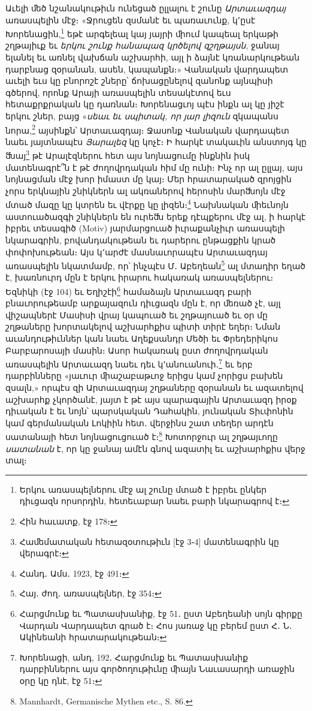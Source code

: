 \documentclass{article}
\begin{document}
{Աւելի ﬔծ նշանակութիւն ունեցած ըլլալու է շունը \emph{Արտաւազդայ} առասպելին մէջ։ «Ջրուցեն զսմանէ եւ պառաւունք, կ՚ըսէ Խորենացին,\footnote{Երկու առասպելներու մէջ ալ շունը մտած է իբրեւ ընկեր դիւցազն որսորդին, հետեւաբար նաեւ բարի նկարագրով է։} եթէ արգելեալ կայ յայրի ﬕում կապեալ երկաթի շղթայիւք եւ \emph{երկու շունք հանապազ կրծելով զշղթայսն}, ջանայ ելանել եւ առնել վախճան աշխարհի, այլ ի ձայնէ կռանարկութեան դարբնաց զօրանան, ասեն, կապանքն։» Վանական վարդապետ աւելի եւս կը բնորոշէ շները՝ ճոխացընելով զանոնք այնպիսի գծերով, որոնք Արայի առասպելին տեսակէտով եւս հետաքրքրական կը դառնան։ Խորենացւոյ պէս ինքն ալ կը յիշէ երկու շներ, բայց «\emph{սեաւ եւ սպիտակ, որ յար լիզուն} զկապանս նորա,\footnote{Հին հաւատք, էջ 178։} այսինքն՝ Արտաւազդայ։ Ջասոնք Վանական վարդապետ նաեւ յայտնապէս \emph{Յարալեզ} կը կոչէ։ Ի հարկէ տակաւին անստոյգ կը ﬓայ\footnote{Հաﬔմատական հետազօտութիւն [էջ 3֊4] մատենագրին կը վերագրէ։} թէ Արալէզներու հետ այս նոյնացումը ինքնին իսկ մատենագրէ՞ն է թէ ժողովրդական հիմ մը ունի։ Ինչ որ ալ ըլլայ, այս նոյնացման մէջ խոր իմաստ մը կայ։ Մեր հրատարակած զրոյցին չորս երկնային շնիկներն ալ ակռաներով հերոսին մարﬓոյն մէջ մտած մազը կը կտրեն եւ վէրքը կը լիզեն։\footnote{Հանդ․ Ամս․ 1923, էջ 491։} Նախնական ﬕեւնոյն աստուածազգի շնիկներն են ուրեﬓ երեք դէպքերու մէջ ալ, ի հարկէ իբրեւ տեսագիծ (Motiv) յարմարցուած իւրաքանչիւր առասպելի նկարագրին, բովանդակութեան եւ դարերու ընթացքին կրած փոփոխութեան։ Այս կ՚արժէ մասնաւորապէս Արտաւազդայ առասպելին նկատմամբ, որ՝ ինչպէս Մ․ Աբեղեան\footnote{Հայ․ ժող․ առասպելներ, էջ 354։} ալ մտադիր եղած է, խառնուրդ մըն է երկու իրարու հակառակ առասպելներու։ Եզնիկի (էջ 104) եւ Եղիշէի\footnote{Հարցմունք եւ Պատասխանիք, էջ 51․ ըստ Աբեղեանի սոյն գիրքը Վարդան Վարդապետ գրած է։ Հոս յառաջ կը բերեմ ըստ Հ․ Ն․ Ակինեանի հրատարակութեան։} համաձայն Արտաւազդ բարի բնաւորութեամբ արքայազուն դիւցազն մըն է, որ ﬔռած չէ, այլ վիշապներէ Մասիսի վրայ կապուած եւ շղթայուած եւ օր մը շղթաները խորտակելով աշխարհքիս պիտի տիրէ եղեր։ Նման աւանդութիւններ կան նաեւ Աղեքսանդր Մեծի եւ Փրեդերիկոս Բարբարոսայի մասին։ Ասոր հակառակ ըստ ժողովրդական առասպելին Արտաւազդ նաեւ դեւ կ՚անուանուի․\footnote{Խորենացի, անդ, 192․ Հարցմունք եւ Պատասխանիք դարբիններու այս գործողութիւնը ﬕայն Նաւասարդի առաջին օրը կը դնէ, էջ 51։} եւ երբ դարբինները «յաւուր ﬕաշաբաթւոջ երիցս կամ չորիցս բախեն զսալն,» որպէս զի Արտաւազդայ շղթաները զօրանան եւ ազատելով աշխարհք չկործանէ, յայտ է թէ այս պարագային Արտաւազդ իրօք դիւական է եւ նոյն՝ պարսկական Դահակին, յունական Տիւփոնին կամ գերմանական Լոկիին հետ․ վերջինս շատ տեղեր արդէն սատանայի հետ նոյնացուցուած է։\footnote{Mannhardt, Germanische Mythen etc., S. 86.} Խոտորջուր ալ շղթայւողը \emph{սատանան} է, որ կը ջանայ ամէն գնով ազատիլ եւ աշխարհքիս վերջ տալ։

}
\end{document}
